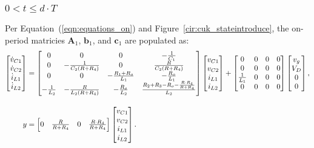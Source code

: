 \subsubsection{$0 < t \leq d \cdot T$}\label{sec:statespace_on}
Per Equation~(\ref{eqn:equations_on}) and Figure~\ref{cir:cuk_stateintroduce}, the on-period matricies $\boldsymbol{A}_1$, $\boldsymbol{b}_1$, and $\boldsymbol{c}_1$ are populated as:
\begin{align*}
\begin{bmatrix}
\dispdot{v_{C1}} \\ \dispdot{v_{C2}} \\ \dispdot{i_{L1}} \\ \dispdot{i_{L2}}
\end{bmatrix}
&=
\begin{bmatrix}
0 & 0 & 0 & \minus\frac{1}{C_1}\\
0 & \minus\frac{1}{C_2(R + R_4)} & 0 & \frac{R}{C_2(R + R_4)}\\
0 & 0 & \minus\frac{R_1 + R_o}{L_1} & \minus\frac{R_o}{L_1}\\
\minus\frac{1}{L_2} & \minus\frac{R}{L_2(R + R_4)} & \minus\frac{R_o}{L_2} & \frac{R_2 + R_3 - R_o - \frac{R \cdot R_4}{R + R_4}}{L_2}
\end{bmatrix}
\begin{bmatrix}
v_{C1} \\ v_{C2} \\ i_{L1} \\ i_{L2}
\end{bmatrix}
+
\begin{bmatrix}
0 & 0 & 0 & 0\\
0 & 0 & 0 & 0\\
\frac{1}{L_1} & 0 & 0 & 0\\
0 & 0 & 0 & 0
\end{bmatrix}
\begin{bmatrix}
v_g \\ V_D \\ 0 \\ 0
\end{bmatrix},
\\[11pt]
y &=
\begin{bmatrix}
0 & \frac{R}{R + R_4} & 0 & \frac{R \cdot R_4}{R + R_4}
\end{bmatrix}
\begin{bmatrix}
v_{C1} \\ v_{C2} \\ i_{L1} \\ i_{L2}
\end{bmatrix}.
\end{align*}
